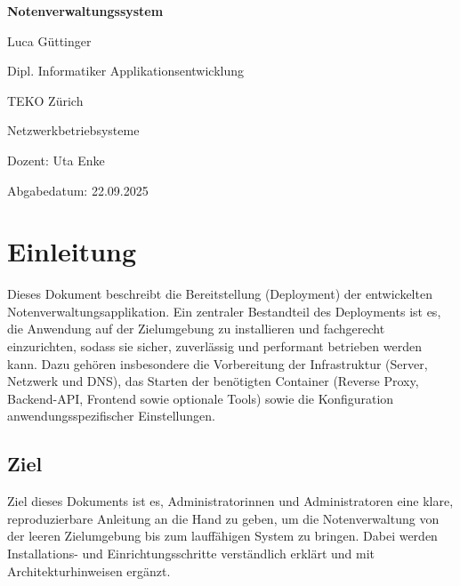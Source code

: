 \documentclass[11pt]{article}
\begin{document}
    \hypersetup{pageanchor=false}
    \begin{titlepage}
        \centering
        {\huge\bfseries Notenverwaltungssystem \par}
        \vspace{2cm}
        {\Large Luca Güttinger \par}
        \vspace{0.5cm}
        {\Large Dipl. Informatiker Applikationsentwicklung \par}
        \vspace{0.5cm}
        {\Large TEKO Zürich \par}
        \vspace{0.5cm}
        {\Large Netzwerkbetriebsysteme \par}
        {\Large Dozent: Uta Enke \par}
        \vspace{0.5cm}
        {\Large Abgabedatum: 22.09.2025 \par}
        \vfill
    \end{titlepage}
    \clearpage
    \hypersetup{pageanchor=true}

    \tableofcontents
    \newpage


    \section{Einleitung}

    Dieses Dokument beschreibt die Bereitstellung (Deployment) der entwickelten Notenverwaltungsapplikation. Ein zentraler
    Bestandteil des Deployments ist es, die Anwendung auf der Zielumgebung zu installieren und fachgerecht einzurichten,
    sodass sie sicher, zuverlässig und performant betrieben werden kann. Dazu gehören insbesondere die Vorbereitung der
    Infrastruktur (Server, Netzwerk und DNS), das Starten der benötigten Container (Reverse Proxy, Backend-API, Frontend
    sowie optionale Tools) sowie die Konfiguration anwendungsspezifischer Einstellungen.

    \subsection{Ziel}
    Ziel dieses Dokuments ist es, Administratorinnen und Administratoren eine klare, reproduzierbare Anleitung an die
    Hand zu geben, um die Notenverwaltung von der leeren Zielumgebung bis zum lauffähigen System zu bringen.
    Dabei werden Installations- und Einrichtungsschritte verständlich erklärt und mit Architekturhinweisen ergänzt.
\end{document}
